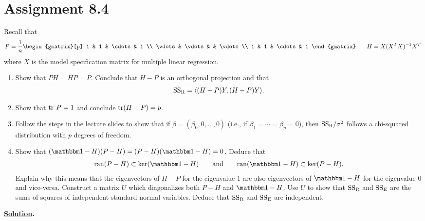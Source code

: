 \section*{Assignment 8.4}

Recall that 
\begin{align*}
P = \frac{1}{n}\begin{gmatrix}[p]
1 & 1 & \cdots & 1 \\
\vdots & \vdots & & \vdots \\
1 & 1 & \cdots & 1
\end{gmatrix}\!\!\!\!, \qquad H = X(X^TX)^{-1}X^T
\end{align*}
where $X$ is the model specification matrix for multiple linear regression.
\begin{enumerate}
	\item Show that $PH = HP = P$. Conclude that $H - P$ is an orthogonal projection and that
	\begin{align*}
	\mathrm{SS_R} = \langle (H-P)Y, (H-P)Y\rangle.
	\end{align*}
	\item Show that $\mathrm{tr}\ P = 1$ and conclude $\mathrm{tr}(H-P) = p$.
	\item Follow the steps in the lecture slides to show that if $\beta = (\beta_0, 0, \ldots, 0)$ (i.e., if $\beta_1 = \cdots = \beta_p = 0$), then $\mathrm{SS_R}/\sigma^2$ follows a chi-squared distribution with $p$ degrees of freedom.
	\item Show that $(\bbone - H)(P-H) = (P-H)(\bbone-H) = 0$. Deduce that
	\begin{align*}
	\U{ran}(P-H)\subset \U{ker}(\bbone - H) \qquad\U{and} \qquad \U{ran}(\bbone-H)\subset \U{ker}(P-H).
	\end{align*}
	Explain why this means that the eigenvectors of $H-P$ for the eigenvalue 1 are also eigenvectors of $\bbone-H$ for the eigenvalue 0 and vice-versa. Construct a matrix $U$ which diagonalizes both $P-H$ and $\bbone-H$. Use $U$ to show that $\mathrm{SS_R}$ and $\mathrm{SS_E}$ are the sums of squares of independent standard normal variables. Deduce that $\mathrm{SS_R}$ and $\mathrm{SS_E}$ are independent.
\end{enumerate}
\textbf{\underline{Solution}.} 
